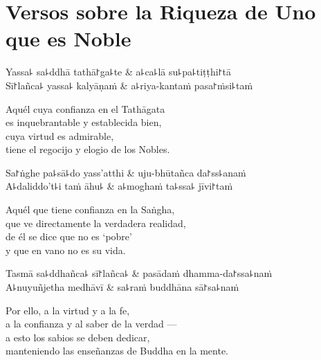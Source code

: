 \chapter{Versos sobre la Riqueza de Uno que es Noble}


\begin{leader}
\end{leader}

\begin{twochants}
  Yassa꜕ sa꜕ddhā tathā꜓ga꜕te & a꜕ca꜕lā su꜕pa꜕tiṭṭhi꜓tā \\
  Sī꜓lañca꜕ yassa꜕ kalyāṇaṁ & a꜕riya-kantaṁ pasa꜓ṁsi꜕taṁ \\
\end{twochants}

\begin{english}
  Aquél cuya confianza en el Tathāgata\\
  es inquebrantable y establecida bien,\\
  cuya virtud es admirable,\\
  tiene el regocijo y elogio de los Nobles.
\end{english}

\begin{twochants}
  Sa꜓ṅghe pa꜕sā꜕do yass'atthi & uju-bhūtañca da꜓ss꜕anaṁ \\
  A꜕daliddo't꜕i taṁ āhu꜕ & a꜕moghaṁ ta꜕ssa꜕ jīvi꜓taṁ \\
\end{twochants}

\begin{english}
  Aquél que tiene confianza en la Saṅgha,\\
  que ve directamente la verdadera realidad,\\
  de él se dice que no es `pobre'\\
  y que en vano no es su vida.
\end{english}

\begin{twochants}
  Tasmā sa꜕ddhañca꜕ sī꜓lañca꜕ & pasādaṁ dhamma-da꜓ssa꜕naṁ \\
  A꜕nuyuñjetha medhāvī & sa꜕raṁ buddhāna sā꜓sa꜕naṁ \\
\end{twochants}

\begin{english}
  Por ello, a la virtud y a la fe,\\
  a la confianza y al saber de la verdad ---\\
  a esto los sabios se deben dedicar,\\
  manteniendo las enseñanzas de Buddha en la mente.
\end{english}

